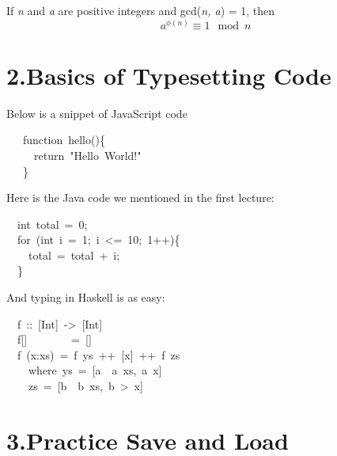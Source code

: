\documentclass[11pt]{article}
\begin{document}
If \emph{n} and \emph{a} are positive integers and gcd(\emph{n, a}) = 1, then%
\label{thm-euler}%
\noindent{}
\noindent\[%
  a^{\phi(n)} \equiv 1 \mod n
\]%

\section{2.\hspace*{0.5em}Basics of Typesetting Code}\label{sec-basics-of-typesetting-code}%

\noindent{}Below is a snippet of JavaScript code%
\begin{mdpre}%
\noindent~~~{function}~hello()\{\\
~~~~~{return}~{"}{Hello~World!}{"}\\
~~~\}%
\end{mdpre}\noindent{}Here is the Java code we mentioned in the first lecture:
\begin{mdpre}%
\noindent~~{int}~total~=~{0};\\
~~{for}~({int}~i~=~{1};~i~\textless{}=~{10};~{1}++)\{\\
~~~~total~=~total~+~i;\\
~~\}%
\end{mdpre}\noindent{}And typing in Haskell is as easy:
\begin{mdpre}%
\noindent~~f~{::}~{[}{Int}{]}~{-\textgreater{}}~{[}{Int}{]}\\
~~f{}[]~~~~~~~~{=}~{}[]\\
~~f~(x:xs)~{=}~f~ys~++~{}[x]~++~f~zs\\
~~~~{where}~ys~{=}~{}[a~{\textbar{}}~a~xs,~a~x]\\
~~~~zs~{=}~{}[b~{\textbar{}}~b~xs,~b~\textgreater{}~x]%
\end{mdpre}
\section{3.\hspace*{0.5em}Practice Save and Load}\label{sec-practice-save-and-load}%
\end{document}
